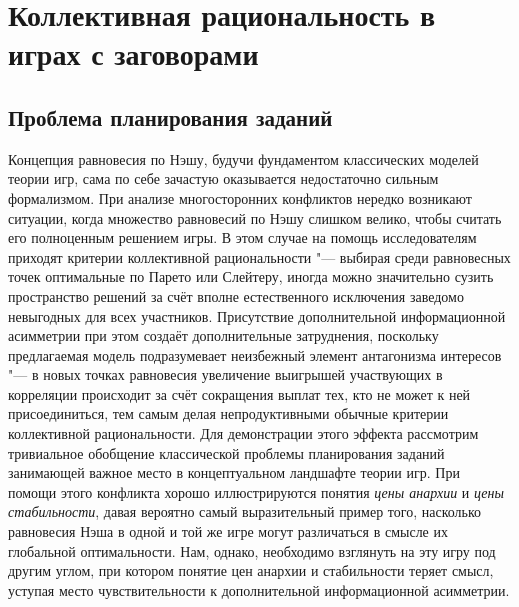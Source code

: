 \chapter{Коллективная рациональность в играх с заговорами}\label{ch:ch2}

\section{Проблема планирования заданий}\label{sec:ch2/sec1}

Концепция равновесия по Нэшу, будучи фундаментом классических моделей теории игр, сама по себе зачастую оказывается недостаточно сильным формализмом. При анализе многосторонних конфликтов нередко возникают ситуации, когда множество равновесий по Нэшу слишком велико, чтобы считать его полноценным решением игры. В этом случае на помощь исследователям приходят критерии коллективной рациональности "--- выбирая среди равновесных точек оптимальные по Парето или Слейтеру, иногда можно значительно сузить пространство решений за счёт вполне естественного исключения заведомо невыгодных для всех участников. Присутствие дополнительной информационной асимметрии при этом создаёт дополнительные затруднения, поскольку предлагаемая модель подразумевает неизбежный элемент антагонизма интересов "--- в новых точках равновесия увеличение выигрышей участвующих в корреляции происходит за счёт сокращения выплат тех, кто не может к ней присоединиться, тем самым делая непродуктивными обычные критерии коллективной рациональности. Для демонстрации этого эффекта рассмотрим тривиальное обобщение классической проблемы планирования заданий \cite{Koutsoupias} занимающей важное место в концептуальном ландшафте теории игр. При помощи этого конфликта хорошо иллюстрируются понятия \emph{цены анархии} и \emph{цены стабильности}, давая вероятно самый выразительный пример того, насколько равновесия Нэша в одной и той же игре могут различаться в смысле их глобальной оптимальности. Нам, однако, необходимо взглянуть на эту игру под другим углом, при котором понятие цен анархии и стабильности теряет смысл, уступая место чувствительности к дополнительной информационной асимметрии.

